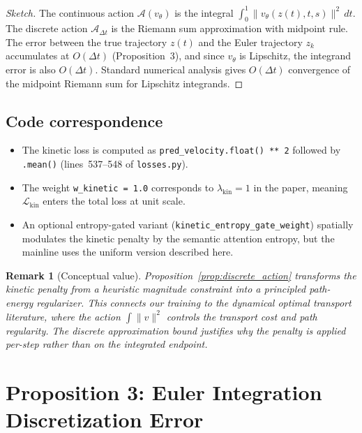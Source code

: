 \documentclass[letterpaper]{article}
\newtheorem{remark}[proposition]{Remark}
\newcommand{\cA}{\mathcal{A}}
\newcommand{\cL}{\mathcal{L}}
\begin{document}
\begin{proof}[Sketch]
The continuous action $\cA(v_\theta)$ is the integral
$\int_0^1 \|v_\theta(z(t), t, s)\|^2 \, dt$.
The discrete action $\cA_{\Delta t}$ is the Riemann sum approximation
with midpoint rule. The error between the true trajectory $z(t)$ and the
Euler trajectory $z_k$ accumulates at $O(\Delta t)$ (Proposition~3), and
since $v_\theta$ is Lipschitz, the integrand error is also $O(\Delta t)$.
Standard numerical analysis gives $O(\Delta t)$ convergence of the midpoint
Riemann sum for Lipschitz integrands.
\end{proof}

\subsection{Code correspondence}

\begin{itemize}
    \item The kinetic loss is computed as \texttt{pred\_velocity.float()\ **\ 2}
    followed by \texttt{.mean()} (lines~537--548 of \texttt{losses.py}).
    \item The weight \texttt{w\_kinetic = 1.0} corresponds to
    $\lambda_{\text{kin}} = 1$ in the paper, meaning $\cL_{\text{kin}}$
    enters the total loss at unit scale.
    \item An optional entropy-gated variant (\texttt{kinetic\_entropy\_gate\_weight})
    spatially modulates the kinetic penalty by the semantic attention entropy,
    but the mainline uses the uniform version described here.
\end{itemize}

\begin{remark}[Conceptual value]
Proposition~\ref{prop:discrete_action} transforms the kinetic penalty from
a heuristic magnitude constraint into a principled path-energy regularizer.
This connects our training to the dynamical optimal transport literature,
where the action $\int\|v\|^2$ controls the transport cost and path regularity.
The discrete approximation bound justifies why the penalty is applied
per-step rather than on the integrated endpoint.
\end{remark}


\section{Proposition 3: Euler Integration Discretization Error}
\end{document}

